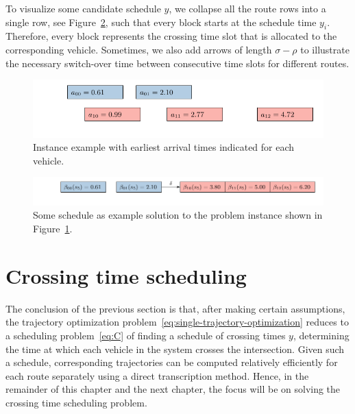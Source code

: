 \documentclass[a4paper]{report}
\theoremstyle{definition}
\theoremstyle{plain}
\begin{document}
To visualize some candidate schedule $y$, we collapse all the route rows into a
single row, see Figure~\ref{fig:solution-example}, such that every block starts at the schedule time
$y_i$. Therefore, every block represents the crossing time slot that is allocated
to the corresponding vehicle. Sometimes, we also add arrows of length $\sigma - \rho$
to illustrate the necessary switch-over time between consecutive time slots for
different routes.



\def\vizfigscale{0.90}
\begin{figure}[h]
  \centering
  \includegraphics[scale=\vizfigscale]{../single/figures/instance}
  \caption{Instance example with earliest arrival times indicated for each vehicle.}%
  \label{fig:instance-example}
\end{figure}

\begin{figure}[h]
  \centering
  \includegraphics[scale=\vizfigscale]{../single/figures/schedule}
  \caption{Some schedule as example solution to the problem instance shown in Figure~\ref{fig:instance-example}.}%
  \label{fig:solution-example}
\end{figure}


\section{Crossing time scheduling}\label{sec:crossing-time-scheduling}

The conclusion of the previous section is that, after making certain
assumptions, the trajectory optimization problem~\eqref{eq:single-trajectory-optimization} reduces to a scheduling
problem~\eqref{eq:C} of finding a schedule of crossing times $y$, determining the time at
which each vehicle in the system crosses the intersection.
%
Given such a schedule, corresponding trajectories can be computed relatively
efficiently for each route separately using a direct transcription method.
%
Hence, in the remainder of this chapter and the next chapter, the focus will be
on solving the crossing time scheduling problem.
\end{document}
